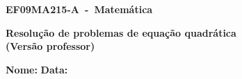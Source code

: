 \documentclass[a4paper,14pt]{article}
\begin{document}
	
	\noindent\textbf{EF09MA215-A~-~Matemática} 
	
	\begin{center}
		\textbf{Resolução de problemas de equação quadrática \\(Versão professor)}
	\end{center}
	
	\bigskip
	
	\noindent\textbf{Nome:} \underline{\hspace{10cm}}
	\noindent\textbf{Data:} \underline{\hspace{4cm}}
	
	\bigskip
	
	
\end{document}
